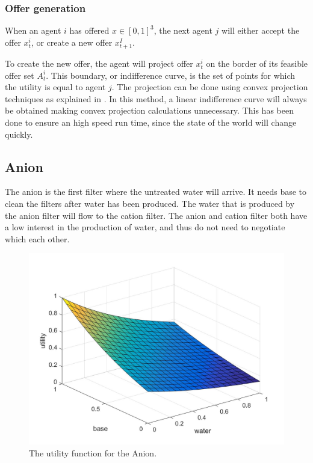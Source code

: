 \subsubsection{Offer generation}
When an agent $i$ has offered $x\in[0,1]^3$, the next agent $j$ will either accept the offer $x^i_t$, or create a new offer $x^I_{t+1}$. 

To create the new offer, the agent will project offer $x^i_t$ on the border of its feasible offer set $A^i_t$. This boundary, or indifference curve, is the set of points for which the utility is equal to agent $j$. The projection can be done using convex projection techniques as explained in \citet{boyd2004convex}. In this method, a linear indifference curve will always be obtained making convex projection calculations unnecessary. This has been done to ensure an high speed run time, since the state of the world will change quickly.



\subsection{Anion}
The anion is the first filter where the untreated water will arrive. It needs base to clean the filters after water has been produced. The water that is produced by the anion filter will flow to the cation filter. The anion and cation filter both have a low interest in the production of water, and thus do not need to negotiate which each other.%

\begin{figure}[h]
	\centering
	\includegraphics[width=0.7\linewidth]{img/Anion_utility}
	\caption{The utility function for the Anion.}
	\label{fig:anionutility}
\end{figure}

